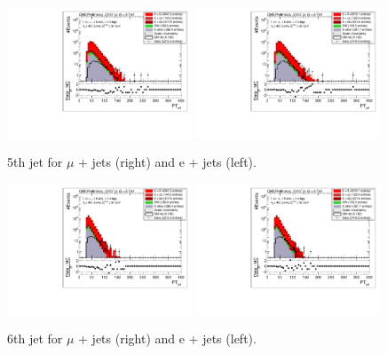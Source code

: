 \begin{figure}[!ht]
    \includegraphics[clip, trim=0.15cm 0.15cm 0.15cm 0.1cm, width=0.49\textwidth]{images/Run1/5thJetPt_StackLogY_Mu.pdf}
    \includegraphics[clip, trim=0.15cm 0.15cm 0.15cm 0.1cm, width=0.49\textwidth]{images/Run1/5thJetPt_StackLogY_e.pdf}
    \caption{5th jet \pt for $\mu$ + jets (right) and e + jets (left).}
    \label{fig:5thjetpt}
\end{figure}

\begin{figure}[!ht]
    \includegraphics[clip, trim=0.15cm 0.15cm 0.15cm 0.1cm, width=0.49\textwidth]{images/Run1/6thJetPt_StackLogY_Mu.pdf}
    \includegraphics[clip, trim=0.15cm 0.15cm 0.15cm 0.1cm, width=0.49\textwidth]{images/Run1/6thJetPt_StackLogY_e.pdf}
    \caption{6th jet \pt for $\mu$ + jets (right) and e + jets (left).}
    \label{fig:6thjetpt}
\end{figure}

